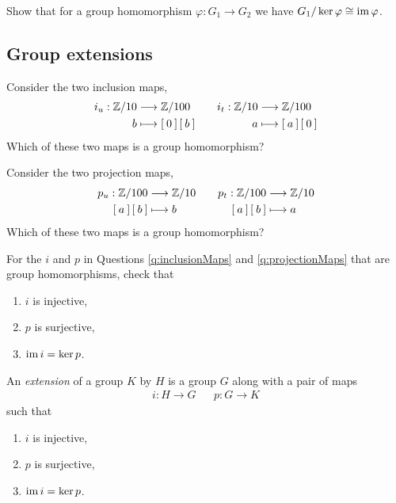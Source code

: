 \begin{qbox}
  Show that for a group homomorphism $\varphi: G_1 \longrightarrow G_2$ we have $G_1 / \ker \varphi \cong \operatorname{im} \varphi$.
\end{qbox}














\newpage
\subsection{Group extensions}

\begin{qbox}
  \label{q:inclusionMaps}
  Consider the two inclusion maps,
  \begin{align*}
    i_u: \mathbb{Z}/10 &\longrightarrow \mathbb{Z}/100  &&& i_t: \mathbb{Z}/10 & \longrightarrow \mathbb{Z}/100 \\
    b &\longmapsto \left[\: 0 \:\right]\left[\: b \:\right] &&& a &\longmapsto \left[\: a \:\right]\left[\: 0 \:\right]
  \end{align*}
  Which of these two maps is a group homomorphism?
\end{qbox}

\begin{qbox}
  \label{q:projectionMaps}
  Consider the two projection maps,
  \begin{align*}
    p_u: \mathbb{Z}/100 &\longrightarrow \mathbb{Z}/10 &&& p_t: \mathbb{Z}/100 &\longrightarrow \mathbb{Z}/10 \\
    \left[\: a \:\right]\left[\: b \:\right] &\longmapsto {b} &&& \left[\: a \:\right]\left[\: b \:\right] &\longmapsto a
  \end{align*}
  Which of these two maps is a group homomorphism?
\end{qbox}


\begin{qbox}
  \label{q:SES1}
  For the $i$ and $p$ in Questions \ref{q:inclusionMaps} and \ref{q:projectionMaps} that are group homomorphisms, check that
  \begin{enumerate}
    \item $i$ is injective,
    \item $p$ is surjective,
    \item $\operatorname{im} i = \ker p$.
  \end{enumerate}
\end{qbox}

\begin{definition}
  An \emph{extension} of a group $K$ by $H$ is a group $G$ along with a pair of maps
  \begin{align*}
    i: H \longrightarrow G && p: G \longrightarrow K
  \end{align*}
  such that
  \begin{enumerate}
    \item $i$ is injective,
    \item $p$ is surjective,
    \item $\operatorname{im} i = \ker p$.
  \end{enumerate}
\end{definition}

